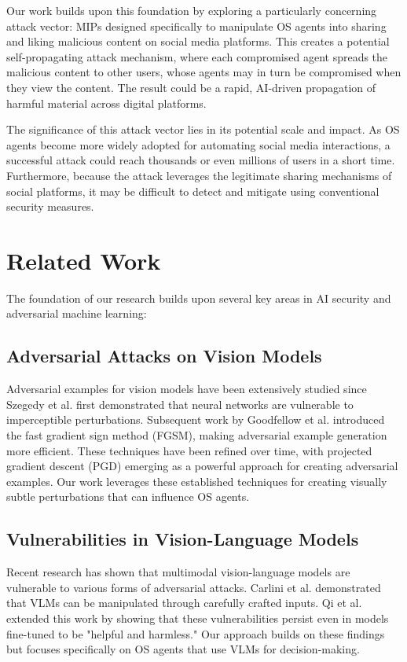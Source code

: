 \documentclass[sigconf]{acmart}
\begin{document}
Our work builds upon this foundation by exploring a particularly concerning attack vector: MIPs designed specifically to manipulate OS agents into sharing and liking malicious content on social media platforms. This creates a potential self-propagating attack mechanism, where each compromised agent spreads the malicious content to other users, whose agents may in turn be compromised when they view the content. The result could be a rapid, AI-driven propagation of harmful material across digital platforms.

The significance of this attack vector lies in its potential scale and impact. As OS agents become more widely adopted for automating social media interactions, a successful attack could reach thousands or even millions of users in a short time. Furthermore, because the attack leverages the legitimate sharing mechanisms of social platforms, it may be difficult to detect and mitigate using conventional security measures.

\section{Related Work}
The foundation of our research builds upon several key areas in AI security and adversarial machine learning:

\subsection{Adversarial Attacks on Vision Models}
Adversarial examples for vision models have been extensively studied since Szegedy et al. \cite{SzegedyZSBEGF13} first demonstrated that neural networks are vulnerable to imperceptible perturbations. Subsequent work by Goodfellow et al. \cite{GoodfellowSS14} introduced the fast gradient sign method (FGSM), making adversarial example generation more efficient. These techniques have been refined over time, with projected gradient descent (PGD) \cite{MadryMSTV18} emerging as a powerful approach for creating adversarial examples. Our work leverages these established techniques for creating visually subtle perturbations that can influence OS agents.

\subsection{Vulnerabilities in Vision-Language Models}
Recent research has shown that multimodal vision-language models are vulnerable to various forms of adversarial attacks. Carlini et al. \cite{CarliniWZDLGS22} demonstrated that VLMs can be manipulated through carefully crafted inputs. Qi et al. \cite{QiLDLJ23} extended this work by showing that these vulnerabilities persist even in models fine-tuned to be "helpful and harmless." Our approach builds on these findings but focuses specifically on OS agents that use VLMs for decision-making.
\end{document}
